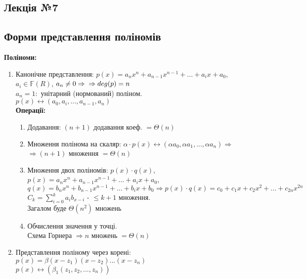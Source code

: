 \documentclass[a4paper,12pt]{article}
\newcommand{\dsum}{\displaystyle\sum}
\begin{document}
\newpage
    \begin{center}
        \hrulefill
        \section{Лекція №7}
        \hrulefill
    \end{center}
    \subsection{Форми представлення поліномів}
    \textbf{Поліноми:}
    \begin{enumerate}
        \item Канонічне представлення: $p(x)=a_nx^n+a_{n-1}x^{n-1}+...+a_ix+a_0$, $a_i\in \mathbb{F}(R)$, $a_n\ne0\Rightarrow \\ \Rightarrow deg(p)=n$ \\
        $a_n=1:$ унітарний (нормований) поліном. \\
        $p(x)\leftrightarrow (a_0,a_i,...,a_{n-1},a_n)$ \\
        \textbf{Операції:} 
        \begin{enumerate}
            \item Додавання: $(n+1)$ додавання коеф. $=\Theta(n)$
            \item Множення полінома на скаляр: $\alpha\cdot p(x)\leftrightarrow (\alpha a_0,\alpha a_1,...,\alpha a_n)\Rightarrow$ \\ 
            $\Rightarrow(n+1)$ множення $=\Theta(n)$
            \item Множення двох поліномів: $p(x)\cdot q(x)$, $p(x)=a_nx^n+a_{n-1}x^{n-1}+...+a_ix+a_0$, \\ 
            $q(x)=b_nx^n+b_{n-1}x^{n-1}+...+b_ix+b_0\Rightarrow p(x)\cdot q(x)=c_0+c_1x+c_2x^2+...+c_{2n}x^{2n}$ \\
            $C_k=\dsum\limits_{i=0}^{k}a_ib_{x-i}$ - $\leqslant k+1$ множення. \\
            Загалом буде $\Theta(n^2)$ множень
            \item Обчислення значення у точці. \\
            Схема Горнера $\Rightarrow n$ множень $=\Theta(n)$
        \end{enumerate}
        \item Представлення поліному через корені: \\
        $p(x)=\beta(x-z_1)(x-z_2)...(x-z_n)$ \\
        $p(x)\leftrightarrow(\beta_1(z_1,z_2,...,z_n))$ \\

\end{enumerate}
\end{document}
